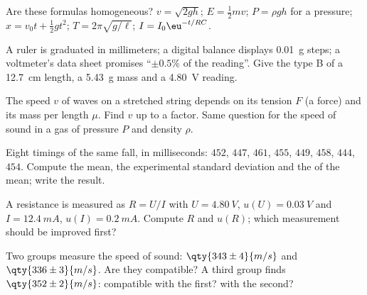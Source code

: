 \begin{exercise}[$\star$]\label{exo:b1:units-dimensions:3}
Are these formulas homogeneous? $v = \sqrt{2gh}$;
$E = \tfrac12 m v$; $P = \rho g h$ for a pressure; $x = v_0 t +
\tfrac12 g t^2$; $T = 2\pi\sqrt{g/\ell}$; $I = I_0 \eu^{-t/RC}$.
\end{exercise}

\begin{exercise}[$\star$]\label{exo:b1:units-dimensions:4}
A ruler is graduated in millimeters; a digital balance displays
\qty{0.01}{g} steps; a voltmeter's data sheet promises ``$\pm 0.5\%$ of
the reading''. Give the type B  of a \qty{12.7}{cm}
length, a \qty{5.43}{g} mass and a \qty{4.80}{V} reading.
\end{exercise}

\begin{exercise}[$\star\star$]\label{exo:b1:units-dimensions:5}
The speed $v$ of waves on a stretched string depends on its tension $F$
(a force) and its mass per  length $\mu$. Find $v$ up to a
 factor. Same question for the speed of sound in a gas of
pressure $P$ and density $\rho$.
\end{exercise}

\begin{exercise}[$\star\star$]\label{exo:b1:units-dimensions:6}
Eight timings of the same fall, in milliseconds: $452$, $447$, $461$,
$455$, $449$, $458$, $444$, $454$. Compute the mean, the experimental
standard deviation and the  of the mean; write the
result.
\end{exercise}

\begin{exercise}[$\star\star$]\label{exo:b1:units-dimensions:7}
A resistance is measured as $R = U/I$ with $U = \qty{4.80}{V}$,
$u(U) = \qty{0.03}{V}$ and $I = \qty{12.4}{mA}$, $u(I) = \qty{0.2}{mA}$.
Compute $R$ and $u(R)$; which measurement should be improved first?
\end{exercise}

\begin{exercise}[$\star\star$]\label{exo:b1:units-dimensions:8}
Two groups measure the speed of sound: $\qty{343\pm4}{m/s}$ and
$\qty{336\pm3}{m/s}$. Are they compatible? A third group finds
$\qty{352\pm2}{m/s}$: compatible with the first? with the second?
\end{exercise}

